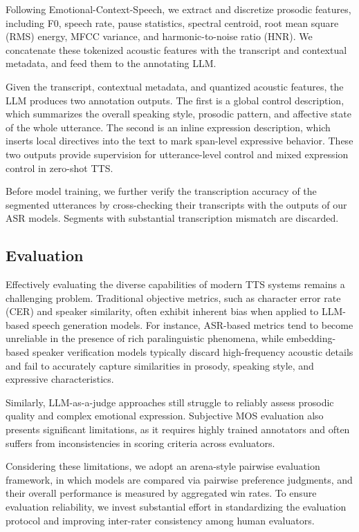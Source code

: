 Following Emotional-Context-Speech, we extract and discretize prosodic features, including F0, speech rate, pause statistics, spectral centroid, root mean square (RMS) energy, MFCC variance, and harmonic-to-noise ratio (HNR). We concatenate these tokenized acoustic features with the transcript and contextual metadata, and feed them to the annotating LLM.

Given the transcript, contextual metadata, and quantized acoustic features, the LLM produces two annotation outputs. The first is a global control description, which summarizes the overall speaking style, prosodic pattern, and affective state of the whole utterance. The second is an inline expression description, which inserts local directives into the text to mark span-level expressive behavior. These two outputs provide supervision for utterance-level control and mixed expression control in zero-shot TTS.

Before model training, we further verify the transcription accuracy of the segmented utterances by cross-checking their transcripts with the outputs of our ASR models. Segments with substantial transcription mismatch are discarded.


\subsection{Evaluation}
Effectively evaluating the diverse capabilities of modern TTS systems remains a challenging problem. Traditional objective metrics, such as character error rate (CER) and speaker similarity, often exhibit inherent bias when applied to LLM-based speech generation models. For instance, ASR-based metrics tend to become unreliable in the presence of rich paralinguistic phenomena, while embedding-based speaker verification models typically discard high-frequency acoustic details and fail to accurately capture similarities in prosody, speaking style, and expressive characteristics.

Similarly, LLM-as-a-judge approaches still struggle to reliably assess prosodic quality and complex emotional expression. Subjective MOS evaluation also presents significant limitations, as it requires highly trained annotators and often suffers from inconsistencies in scoring criteria across evaluators.

Considering these limitations, we adopt an arena-style pairwise evaluation framework, in which models are compared via pairwise preference judgments, and their overall performance is measured by aggregated win rates. To ensure evaluation reliability, we invest substantial effort in standardizing the evaluation protocol and improving inter-rater consistency among human evaluators.

